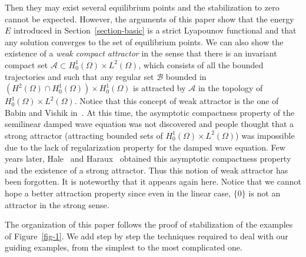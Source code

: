 \documentclass[AHL,Unicode,longabstracts]{cedram}
\newcommand{\Ac}{\mathcal{A}}
\newcommand{\Bc}{\mathcal{B}}
\begin{document}
\begin{itemize}
Then they may exist several equilibrium points and the stabilization to zero cannot be expected. However, the arguments of this paper show that the energy $E$ introduced in Section~\ref{section-basic} is a strict Lyapounov functional and that any solution converges to the set of equilibrium points. We can also show the existence of a \emph{weak compact attractor} in the sense that there is an invariant compact set $\Ac\subset H^1_0(\Omega)\times L^2(\Omega)$, which consists of all the bounded trajectories and such that any regular set $\Bc$ bounded in $(H^2(\Omega)\cap H^1_0(\Omega))\times H^1_0(\Omega)$ is attracted by $\Ac$ in the topology of $H^1_0(\Omega)\times L^2(\Omega)$. Notice that this concept of weak attractor is the one of Babin and Vishik in~\cite{Babin-Vishik}. At this time, the asymptotic compactness property of the semilinear damped wave equation was not discovered and people thought that a strong attractor (attracting bounded sets of $H^1_0(\Omega)\times L^2(\Omega)$) was impossible due to the lack of regularization property for the damped wave equation. Few years later, Hale~\cite{Hale-book} and Haraux~\cite{Haraux} obtained this asymptotic compactness property and the existence of a strong attractor. Thus this notion of weak attractor has been forgotten. It is noteworthy that it appears again here. Notice that we cannot hope a better attraction property since even in the linear case, $\{0\}$ is not an attractor in the strong sense.
\end{itemize}


The organization of this paper follows the proof of stabilization of the examples of Figure~\ref{fig-1}. We add step by step the techniques required to deal with our guiding examples, from the simplest to the most complicated one.
\end{document}
